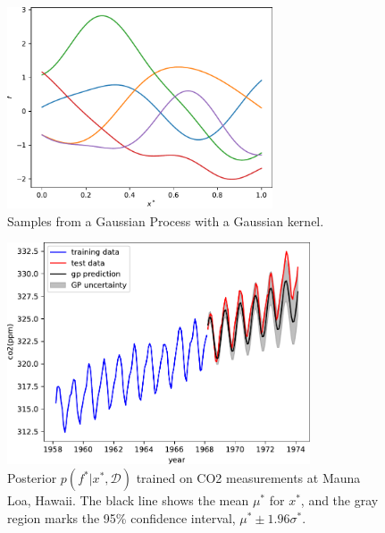 \begin{figure}[htbp]
  \centering
  \includegraphics[width=0.7\textwidth]{./figures/gp_samples.pdf}
  \caption{Samples from a Gaussian Process with a Gaussian kernel.}
  \label{fig:week4:gp:gp-samples}
\end{figure}

\begin{figure}[htbp]
  \centering
  \includegraphics[width=0.8\textwidth]{./figures/gp_predict.pdf}
  \caption{
    Posterior $p(f^\ast | x^\ast, \mathcal{D})$ trained on
    CO2 measurements at Mauna Loa, Hawaii.
    The black line shows the mean $\mu^\ast$ for $x^\ast$,
    and the gray region marks the 95\% confidence interval,
    $\mu^\ast \pm 1.96 \sigma^\ast$.
  }
  \label{fig:week4:gp:predict}
\end{figure}

